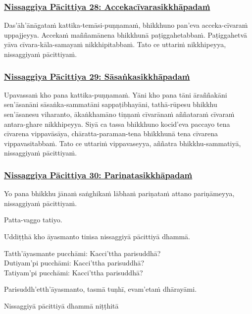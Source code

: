 \subsubsection*{\hyperref[forf-exp28]{Nissaggiya Pācittiya 28: Accekacīvarasikkhāpadaṁ}}
\label{np28}

Das'āh'ānāgataṁ kattika-temāsi-puṇṇamaṁ, bhikkhuno pan'eva acceka-cīvaraṁ uppajjeyya. Accekaṁ maññamānena bhikkhunā paṭiggahetabbaṁ. Paṭiggahetvā yāva cīvara-kāla-samayaṁ nikkhipitabbaṁ. Tato ce uttariṁ nikkhipeyya, nissaggiyaṁ pācittiyaṁ.

\subsubsection*{\hyperref[forf-exp29]{Nissaggiya Pācittiya 29: Sāsaṅkasikkhāpadaṁ}}
\label{np29}

Upavassaṁ kho pana kattika-puṇṇamaṁ. Yāni kho pana tāni āraññakāni sen'āsanāni sāsaṅka-sammatāni sappaṭibhayāni, tathā-rūpesu bhikkhu sen'āsanesu viharanto, ākaṅkhamāno tiṇṇaṁ cīvarānaṁ aññataraṁ cīvaraṁ antara-ghare nikkhipeyya. Siyā ca tassa bhikkhuno kocid'eva paccayo tena cīvarena vippavāsāya, chāratta-paraman-tena bhikkhunā tena cīvarena vippavasitabbaṁ. Tato ce uttariṁ vippavaseyya, aññatra bhikkhu-sammatiyā, nissaggiyaṁ pācittiyaṁ.

\subsubsection*{\hyperref[forf-exp30]{Nissaggiya Pācittiya 30: Pariṇatasikkhāpadaṁ}}
\label{np30}

Yo pana bhikkhu jānaṁ saṅghikaṁ lābhaṁ pariṇataṁ attano pariṇāmeyya, nissaggiyaṁ pācittiyaṁ.

\begin{center}
  Patta-vaggo tatiyo.
\end{center}

\medskip

\begin{center}
Uddiṭṭhā kho āyasmanto tiṁsa nissaggiyā pācittiyā dhammā.

\smallskip

Tatth'āyasmante pucchāmi: Kacci'ttha parisuddhā?\\
Dutiyam'pi pucchāmi: Kacci'ttha parisuddhā?\\
Tatiyam'pi pucchāmi: Kacci'ttha parisuddhā?

\smallskip

Parisuddh'etth'āyasmanto, tasmā tuṇhī, evam'etaṁ dhārayāmi.
\end{center}

\begin{outro}
  Nissaggiyā pācittiyā dhammā niṭṭhitā
\end{outro}

\clearpage
